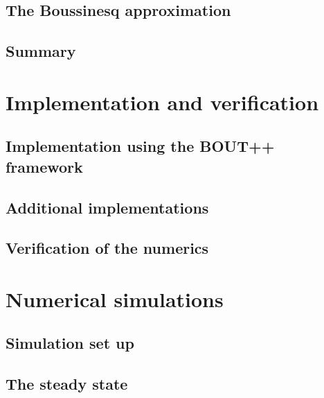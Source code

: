 \documentclass[12pt,a4paper,oneside,openright]{report} %
\begin{document}
\chapter{The Boussinesq approximation}
\label{chap:boussinesq}

\chapter{Summary}
\label{chap:derivSummary}


\part{Implementation and verification}
\label{part:impl}
\chapter{Implementation using the BOUT++ framework}
\label{chap:implBOUT++}




\chapter{Additional implementations}
\label{chap:additionalImplementation}






\chapter{Verification of the numerics}
\label{chap:verification}


\part{Numerical simulations}
\label{part:results}
\chapter{Simulation set up}
\label{chap:setup}

\chapter{The steady state}
\label{chap:ss}

\end{document}
